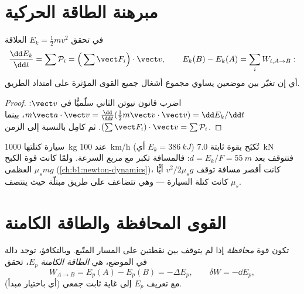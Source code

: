 \section{مبرهنة الطاقة الحركية}

\begin{theorem}\label{thm:b1:work-and-energy:ke}
في  تحقق \emph{} $E_k = \tfrac12 mv^2$  العلاقة
\[
\frac{\dd E_k}{\dd t} = \sum\mathcal P_i = \Big(\sum\vect F_i\Big)\cdot\vect v,
\qquad
E_k(B) - E_k(A) = \sum_i W_{i,A\to B}:
\]
أي إن تغيّر  بين موضعين يساوي مجموع أشغال
جميع القوى المؤثرة على امتداد الطريق.
\end{theorem}

\begin{proof}
اضرب قانون نيوتن الثاني سلّميًّا في $\vect v$: $m\vect a\cdot\vect v =
\tfrac{\dd}{\dd t}(\tfrac12 m\vect v\cdot\vect v) = \dd E_k/\dd t$، بينما
$(\sum\vect F_i)\cdot\vect v = \sum\mathcal P_i$. ثم كامِل بالنسبة إلى الزمن.
\end{proof}

\begin{example}\label{ex:b1:work-and-energy:braking}
سيارة كتلتها \qty{1000}{kg} عند \qty{100}{km/h} (أي $E_k = \qty{386}{kJ}$) تُكبَح
بقوة ثابتة \qty{7.0}{kN} فتتوقف بعد $d = E_k/F = \qty{55}{m}$:
فالمسافة تكبر مع \emph{مربع} السرعة. ولمّا كانت قوة
الكبح العظمى $\mu_smg$ (\cref{ch:b1:newton-dynamics})، كانت
أقصر مسافة توقف $v^2/2\mu_sg$ أيًّا كانت كتلة السيارة ---
وهي تتضاعف على طريق مبتلّة حيث ينتصف $\mu_s$.
\end{example}

\section{القوى المحافظة والطاقة الكامنة}

\begin{definition}\label{def:b1:work-and-energy:conservative}
تكون قوة \emph{محافظة} إذا لم يتوقف  بين نقطتين
على المسار المتّبع. وبالتكافؤ، توجد دالة في الموضع،
هي \emph{الطاقة الكامنة} $E_p$، تحقق
\[
W_{A\to B} = E_p(A) - E_p(B) = -\Delta E_p ,
\qquad \delta W = -\dd E_p ,
\]
مع تعريف $E_p$ إلى غاية ثابت جمعي (أي باختيار مبدأ).
\end{definition}

